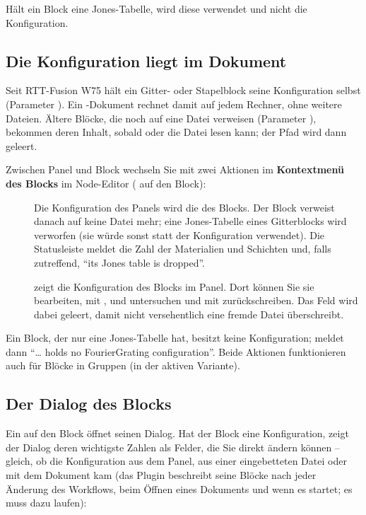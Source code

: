 Hält ein Block eine Jones-Tabelle, wird diese verwendet und nicht die Konfiguration.

\subsection{Die Konfiguration liegt im Dokument}

Seit RTT-Fusion W75 hält ein Gitter- oder Stapelblock seine Konfiguration selbst
(Parameter ). Ein -Dokument rechnet damit auf jedem Rechner, ohne weitere
Dateien. Ältere Blöcke, die noch auf eine Datei verweisen (Parameter ),
bekommen deren Inhalt, sobald  oder  die Datei lesen kann; der
Pfad wird dann geleert.

Zwischen Panel und Block wechseln Sie mit zwei Aktionen im \textbf{Kontextmenü des Blocks} im
Node-Editor ( auf den Block):

\begin{description}
  \item[] Die Konfiguration des Panels wird die des Blocks.
    Der Block verweist danach auf keine Datei mehr; eine Jones-Tabelle eines Gitterblocks wird
    verworfen (sie würde sonst statt der Konfiguration verwendet). Die Statusleiste meldet die Zahl
    der Materialien und Schichten und, falls zutreffend, \enquote{its Jones table is dropped}.
  \item[] zeigt die Konfiguration des Blocks im Panel. Dort
    können Sie sie bearbeiten, mit ,  und  untersuchen und mit
     zurückschreiben. Das Feld  wird
    dabei geleert, damit  nicht versehentlich eine fremde Datei überschreibt.
\end{description}

Ein Block, der nur eine Jones-Tabelle hat, besitzt keine Konfiguration;  meldet dann \enquote{… holds no FourierGrating configuration}. Beide
Aktionen funktionieren auch für Blöcke in Gruppen (in der aktiven Variante).

\subsection{Der Dialog des Blocks}

Ein  auf den Block öffnet seinen Dialog. Hat der Block eine Konfiguration, zeigt
der Dialog deren wichtigste Zahlen als Felder, die Sie direkt ändern können -- gleich, ob die
Konfiguration aus dem Panel, aus einer eingebetteten Datei oder mit dem Dokument kam (das Plugin
beschreibt seine Blöcke nach jeder Änderung des Workflows, beim Öffnen eines Dokuments und wenn es
startet; es muss dazu laufen):

